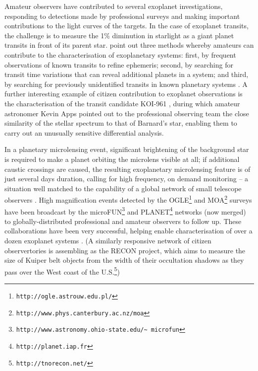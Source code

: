 \documentclass{ar2e}
\def\CaseStudy#1{\noindent{\it\bf #1 \,\,\,\,}}
\def\url#1{\texttt{#1}}
\begin{document}
\CaseStudy{Transiting and Microlensing Exoplanets.}  
Amateur observers have contributed to several exoplanet investigations,
responding to detections made by professional surveys and making important
contributions to the light curves of the targets. In the case of exoplanet
transits, the challenge is to measure the 1\% diminution in starlight as a giant
planet transits in front of its parent star. \citet{14mousis_proam} point out three
methods whereby amateurs can contribute to the characterisation of exoplanetary
systems: first, by frequent observations of known transits to refine ephemeris;
second, by searching for transit time variations that can reveal additional
planets in a system; and third, by searching for previously unidentified
transits in known planetary systems \citep[e.g., the discovery of the transit of
HD 80606b from a 30 cm telescope near London,][]{09fossey}. 
A further interesting example of citizen contribution to exoplanet observations
is the characterisation of the transit candidate KOI-961 \citep{Muirhead2012}, 
during which amateur astronomer Kevin Apps pointed out to 
the professional observing 
team the close similarity of the stellar spectrum to that of Barnard's star,
enabling them to carry out an unusually sensitive differential analysis. 

In a planetary microlensing event, significant brightening of the background
star is required to make a planet orbiting the microlens visible at all; if
additional caustic crossings are caused, the resulting exoplanetary microlensing
feature is of just several days duration, calling for high frequency, on demand
monitoring -- a situation well matched to the capability of a global network of
small telescope observers \citep[see e.g.\ ][]{Christie2006}. High magnification
events detected by the  OGLE\footnote{\url{http://ogle.astrouw.edu.pl/}} and
MOA\footnote{\url{http://www.phys.canterbury.ac.nz/moa}} surveys have been
broadcast by the
microFUN\footnote{\url{http://www.astronomy.ohio-state.edu/\textasciitilde
microfun}} and PLANET\footnote{\url{http://planet.iap.fr}} networks (now merged)
to globally-distributed professional and amateur observers to follow up. These
collaborations have been very successful, helping enable characterisation of
over a dozen exoplanet systems \citep[see e.g.\ ][and references
therein]{Udalski++2005,Gould++2014}. (A similarly responsive network of citizen
observertories is assembling as the RECON project, which aims to measure the
size of Kuiper
belt objects from the width of their occultation shadows as they pass over the
West coast of the U.S.\footnote{\url{http://tnorecon.net/}})
\end{document}
